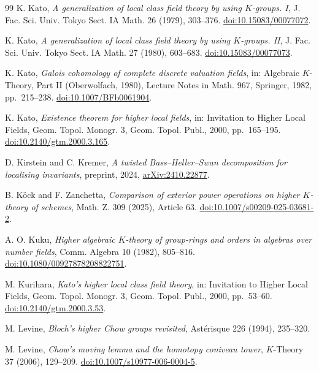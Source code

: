 \begin{thebibliography}{99}
 K. Kato,
\emph{A generalization of local class field theory by using $K$-groups. I},
J. Fac. Sci. Univ. Tokyo Sect. IA Math. 26 (1979), 303--376.
\href{https://doi.org/10.15083/00077072}{doi:10.15083/00077072}.

 K. Kato,
\emph{A generalization of local class field theory by using $K$-groups. II},
J. Fac. Sci. Univ. Tokyo Sect. IA Math. 27 (1980), 603--683.
\href{https://doi.org/10.15083/00077073}{doi:10.15083/00077073}.

 K. Kato,
\emph{Galois cohomology of complete discrete valuation fields},
in: Algebraic $K$-Theory, Part II (Oberwolfach, 1980), Lecture Notes in Math. 967, Springer, 1982, pp.~215--238.
\href{https://doi.org/10.1007/BFb0061904}{doi:10.1007/BFb0061904}.

 K. Kato,
\emph{Existence theorem for higher local fields},
in: Invitation to Higher Local Fields, Geom. Topol. Monogr. 3, Geom. Topol. Publ., 2000, pp.~165--195.
\href{https://doi.org/10.2140/gtm.2000.3.165}{doi:10.2140/gtm.2000.3.165}.

 D. Kirstein and C. Kremer,
\emph{A twisted Bass--Heller--Swan decomposition for localising invariants}, preprint, 2024,
\href{https://arxiv.org/abs/2410.22877v1}{arXiv:2410.22877}.

 B. K\"ock and F. Zanchetta,
\emph{Comparison of exterior power operations on higher $K$-theory of schemes},
Math. Z. 309 (2025), Article 63.
\href{https://doi.org/10.1007/s00209-025-03681-2}{doi:10.1007/s00209-025-03681-2}.

 A. O. Kuku,
\emph{Higher algebraic $K$-theory of group-rings and orders in algebras over number fields},
Comm. Algebra 10 (1982), 805--816.
\href{https://doi.org/10.1080/00927878208822751}{doi:10.1080/00927878208822751}.

 M. Kurihara,
\emph{Kato's higher local class field theory},
in: Invitation to Higher Local Fields, Geom. Topol. Monogr. 3, Geom. Topol. Publ., 2000, pp.~53--60.
\href{https://doi.org/10.2140/gtm.2000.3.53}{doi:10.2140/gtm.2000.3.53}.

 M. Levine,
\emph{Bloch's higher Chow groups revisited},
Astérisque 226 (1994), 235--320.

 M. Levine,
\emph{Chow's moving lemma and the homotopy coniveau tower},
$K$-Theory 37 (2006), 129--209.
\href{https://doi.org/10.1007/s10977-006-0004-5}{doi:10.1007/s10977-006-0004-5}.


\end{thebibliography}
